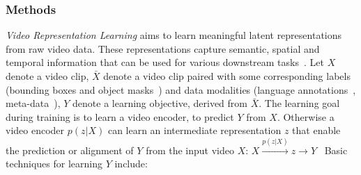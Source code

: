 \subsubsection{Methods}
\textit{Video Representation Learning} aims to learn meaningful latent representations from raw video data. These representations capture semantic, spatial and temporal information that can be used for various downstream tasks~\cite{McCarthy_2025}. Let $X$ denote a video clip, $\bar X$ denote a video clip paired with some corresponding labels (bounding boxes and object masks~\cite{Ding2023MOSEAN}) and data modalities (language annotations~\cite{Grauman2021Ego4DAT}, meta-data~\cite{ChantrySchiappa2022SelfSupervisedLF}), $Y$ denote a learning objective, derived from $\bar X$.
The learning goal during training is to learn a video encoder, to predict $Y$ from $X$. Otherwise a video encoder $p(z|X)$ can learn an intermediate representation $z$ that enable the prediction or alignment of $Y$ from the input video $X$:  $X \xrightarrow{p(z|X)} z \rightarrow Y$~\cite{McCarthy_2025}
Basic techniques for learning $Y$ include:
